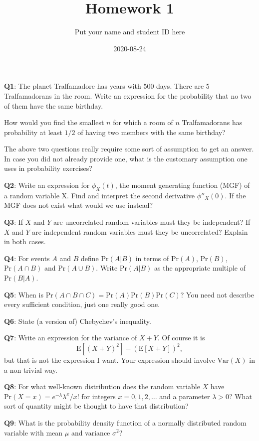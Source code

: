\documentclass[]{article}
\title{Homework 1}
\author{Put your name and student ID here}
\date{2020-08-24}
\begin{document}
\maketitle

\textbf{Q1}: The planet Tralfamadore has years with 500 days. There are
5 Tralfamadorans in the room. Write an expression for the probability
that no two of them have the same birthday.

How would you find the smallest \(n\) for which a room of \(n\)
Tralfamadorans has probability at least \(1/2\) of having two members
with the same birthday?

The above two questions really require some sort of assumption to get an
answer. In case you did not already provide one, what is the customary
assumption one uses in probability exercises?

\textbf{Q2}: Write an expression for \(\phi_X(t)\), the moment
generating function (MGF) of a random variable X. Find and interpret the
second derivative \(\phi{''}_X(0)\). If the MGF does not exist what
would we use instead?

\textbf{Q3}: If \(X\) and \(Y\) are uncorrelated random variables must
they be independent? If \(X\) and \(Y\) are independent random variables
must they be uncorrelated? Explain in both cases.

\textbf{Q4}: For events \(A\) and \(B\) define \(\mathrm{Pr}(A|B)\) in
terms of \(\mathrm{Pr}(A)\), \(\mathrm{Pr}(B)\),
\(\mathrm{Pr}(A \cap B)\) and \(\mathrm{Pr}(A\cup B)\). Write
\(\mathrm{Pr}(A|B)\) as the appropriate multiple of
\(\mathrm{Pr}(B|A)\).

\textbf{Q5}: When is
\(\mathrm{Pr}(A\cap B \cap C)=\mathrm{Pr}(A)\mathrm{Pr}(B)\mathrm{Pr}(C)\)?
You need not describe every sufficient condition, just one really good
one.

\textbf{Q6}: State (a version of) Chebychev's inequality.

\textbf{Q7}: Write an expression for the variance of \(X + Y\). Of
course it is \[\mathrm{E}[(X+Y)^2]-(\mathrm{E}[X+Y])^2,\] but that is
not the expression I want. Your expression should involve
\(\mathrm{Var}(X)\) in a non-trivial way.

\textbf{Q8}: For what well-known distribution does the random variable
\(X\) have \(\mathrm{Pr}(X = x) = e^{-\lambda}\lambda^x/x!\) for
integers \(x=0,1,2,\dots\) and a parameter \(\lambda>0\)? What sort of
quantity might be thought to have that distribution?

\textbf{Q9}: What is the probability density function of a normally
distributed random variable with mean \(\mu\) and variance \(\sigma^2\)?
\end{document}
